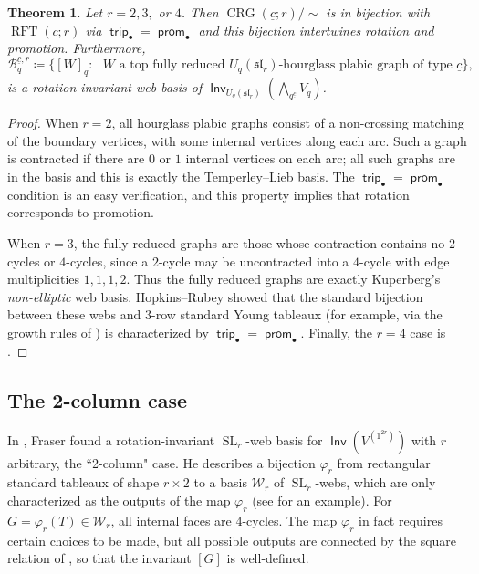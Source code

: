 \documentclass{amsart}
\newtheorem{theorem}{Theorem}[section]
\theoremstyle{definition}
\theoremstyle{remark}
\numberwithin{equation}{section}
\DeclareMathOperator{\trip}{\mathsf{trip}}
\DeclareMathOperator{\rft}{RFT}
\DeclareMathOperator{\prom}{\mathsf{prom}}
\DeclareMathOperator{\SL}{SL}
\newcommand{\fsl}{\mathfrak{sl}}
\DeclareMathOperator{\Inv}{\mathsf{Inv}}
\DeclareMathOperator{\crg}{CRG}
\begin{document}
\begin{theorem}
\label{thm:unified-web-basis}
Let $r=2,3,$ or $4$. Then $\crg(\underline{c};r)/{\sim}$ is in bijection with $\rft(\underline{c};r)$ via $\trip_{\bullet}=\prom_{\bullet}$ and this bijection intertwines rotation and promotion. Furthermore,
\[
\mathscr{B}_q^{\underline{c},r} \coloneqq \{[W]_q : \text{ $W$ a top fully reduced $U_q(\fsl_r)$-hourglass plabic graph of type $\underline{c}$}\},
\]
is a rotation-invariant web basis of $\Inv_{U_q(\fsl_r)}(\bigwedge_q\nolimits^{\underline{c}} V_q)$. 
\end{theorem}
\begin{proof}
When $r=2$, all hourglass plabic graphs consist of a non-crossing matching of the boundary vertices, with some internal vertices along each arc. Such a graph is contracted if there are $0$ or $1$ internal vertices on each arc; all such graphs are in the basis and this is exactly the Temperley--Lieb basis. The $\trip_{\bullet}=\prom_{\bullet}$ condition is an easy verification, and this property implies that rotation corresponds to promotion. 

When $r=3$, the fully reduced graphs are those whose contraction contains no $2$-cycles or $4$-cycles, since a $2$-cycle may be uncontracted into a $4$-cycle with edge multiplicities $1,1,1,2$. Thus the fully reduced graphs are exactly Kuperberg's \emph{non-elliptic} web basis. Hopkins--Rubey \cite{Hopkins-Rubey,Hopkins:talk} showed that the standard bijection between these webs and $3$-row standard Young tableaux (for example, via the growth rules of \cite{Khovanov-Kuperberg,Petersen-Pylyavskyy-Rhoades}) is characterized by $\trip_{\bullet}=\prom_{\bullet}$. Finally, the $r=4$ case is .
\end{proof}

\subsection{The 2-column case}
In \cite{Fraser-2-column}, Fraser found a rotation-invariant $\SL_r$-web basis for $\Inv(V^{(1^{2r})})$ with $r$ arbitrary, the ``2-column" case. He describes a bijection $\varphi_r$ from rectangular standard tableaux of shape $r \times 2$ to a basis $\mathcal{W}_r$ of $\SL_r$-webs, which are only characterized as the outputs of the map $\varphi_r$ (see  for an example). For $G = \varphi_r(T) \in \mathcal{W}_r$, all internal faces are $4$-cycles. The map $\varphi_r$ in fact requires certain choices to be made, but all possible outputs are connected by the square relation of \cite[Eq.~6.9]{Fraser-Lam-Le}, so that the invariant $[G]$ is well-defined.
\end{document}
